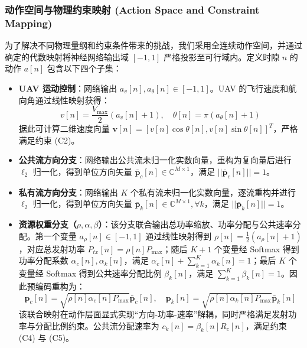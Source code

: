 \documentclass[journal,onecolumn]{IEEEtran}
\begin{document}
	\subsubsection{动作空间与物理约束映射 (Action Space and Constraint Mapping)}
	为了解决不同物理量纲和约束条件带来的挑战，我们采用全连续动作空间，并通过确定的代数映射将神经网络输出域 $[-1, 1]$ 严格投影至可行域内。定义时隙 $n$ 的动作 $a[n]$ 包含以下四个子集：
	\begin{itemize}
		\item \textbf{UAV 运动控制}：网络输出 $a_v[n], a_\theta[n] \in [-1, 1]$。UAV 的飞行速度和航向角通过线性映射获得：
		\begin{equation}
			v[n] = \frac{V_{\max}}{2}(a_v[n] + 1), \quad \theta[n] = \pi(a_\theta[n] + 1)
			\label{eq:action_traj}
		\end{equation}
		据此可计算二维速度向量 $\mathbf{v}[n] = [v[n]\cos\theta[n], v[n]\sin\theta[n]]^T$，严格满足约束 (C2)。
		
		\item \textbf{公共流方向分支}：网络输出公共流未归一化实数向量，重构为复向量后进行 $\ell_2$ 归一化，得到单位方向矢量 $\mathbf{\bar{p}}_c[n] \in \mathbb{C}^{M \times 1}$，满足 $||\mathbf{\bar{p}}_c[n]||=1$。
		
		\item \textbf{私有流方向分支}：网络输出 $K$ 个私有流未归一化实数向量，逐流重构并进行 $\ell_2$ 归一化，得到单位方向矢量 $\mathbf{\bar{p}}_k[n] \in \mathbb{C}^{M \times 1},\forall k$，满足 $||\mathbf{\bar{p}}_k[n]||=1$。
		
		\item \textbf{资源权重分支（$\rho,\alpha,\beta$）}：该分支联合输出总功率缩放、功率分配与公共速率分配。第一个变量 $a_{\rho}[n]\in[-1,1]$ 通过线性映射得到
		$\rho[n]=\frac{1}{2}(a_{\rho}[n]+1)$，对应总发射功率 $P_{tx}[n]=\rho[n]P_{\max}$；随后 $K+1$ 个变量经 Softmax 得到功率分配系数 $\alpha_c[n],\alpha_k[n]$，满足 $\alpha_c[n]+\sum_{k=1}^K\alpha_k[n]=1$；最后 $K$ 个变量经 Softmax 得到公共速率分配比例 $\beta_k[n]$，满足 $\sum_{k=1}^K\beta_k[n]=1$。因此预编码重构为：
		\begin{equation}
			\mathbf{p}_c[n] = \sqrt{\rho[n] \alpha_c[n] P_{\max}} \mathbf{\bar{p}}_c[n], \quad \mathbf{p}_k[n] = \sqrt{\rho[n] \alpha_k[n] P_{\max}} \mathbf{\bar{p}}_k[n]
			\label{eq:action_precoding}
		\end{equation}
		该联合映射在动作层面显式实现“方向-功率-速率”解耦，同时严格满足发射功率与分配比例约束。公共流分配速率为 $c_k[n]=\beta_k[n]R_c[n]$，满足约束 (C4) 与 (C5)。
	\end{itemize}
	
\end{document}
